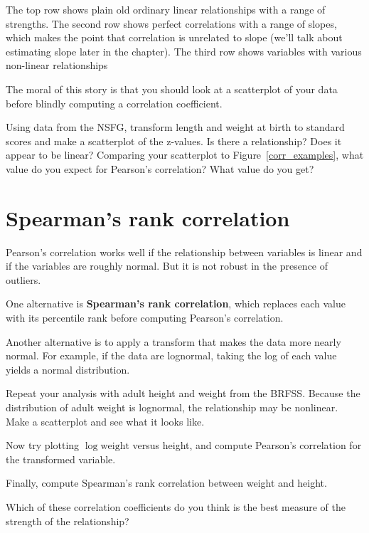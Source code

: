 \documentclass[12pt]{book}
\begin{document}
The top row shows plain old ordinary linear relationships with a range
of strengths.  The second row shows perfect correlations with a range
of slopes, which makes the point that correlation is unrelated to slope
(we'll talk about estimating slope later in the chapter).  The third
row shows variables with various non-linear relationships 

The moral of this story is that you should look at a scatterplot of
your data before blindly computing a correlation coefficient.

\begin{ex}

Using data from the NSFG, transform length and weight at birth to
standard scores and make a scatterplot of the z-values.  Is there
a relationship?  Does it appear to be linear?  Comparing your scatterplot
to Figure~\ref{corr_examples}, what value do you expect for Pearson's
correlation?  What value do you get?

\end{ex}


\section{Spearman's rank correlation}

Pearson's correlation works well if the relationship between variables
is linear and if the variables are roughly normal.  But it is not
robust in the presence of outliers.

One alternative is {\bf Spearman's rank correlation}, which replaces
each value with its percentile rank before computing Pearson's correlation.

Another alternative is to apply a transform that makes the data more
nearly normal.  For example, if the data are lognormal, taking the log
of each value yields a normal distribution.

\begin{ex}

Repeat your analysis with adult height and weight from the BRFSS.
Because the distribution of adult weight is lognormal, the relationship
may be nonlinear.  Make a scatterplot and see what it looks like.

Now try plotting $\log \mathrm{weight}$ versus height, and compute
Pearson's correlation for the transformed variable.

Finally, compute Spearman's rank correlation between weight and height.

Which of these correlation coefficients do you think is the best
measure of the strength of the relationship?

\end{ex}
\end{document}
